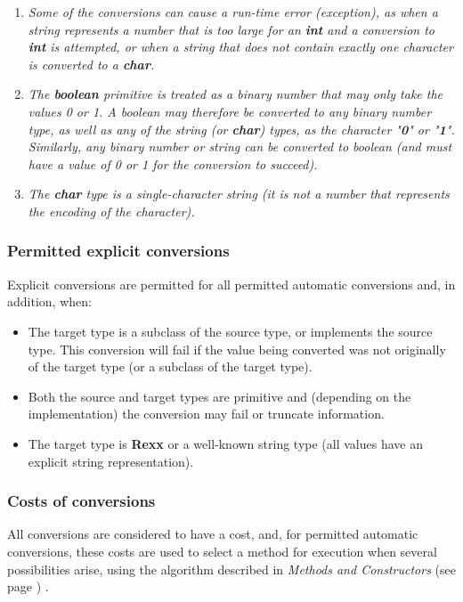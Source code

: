 \begin{enumerate}
\item \emph{Some of the conversions can cause a run-time error (exception), as
when a string represents a number that is too large for an \textbf{int}
and a conversion to \textbf{int} is attempted, or when a string that
does not contain exactly one character is converted to a
\textbf{char}.}
\item 
\emph{The \textbf{boolean} primitive is treated as a binary number that may
only take the values 0 or 1.
A boolean may therefore be converted to
any binary number type, as well as any of the string
(or \textbf{char}) types, as the character "\textbf{0}" or
"\textbf{1}".
Similarly, any binary number or string can be converted to boolean (and
must have a value of 0 or 1 for the conversion to succeed).}
\item 
\emph{The \textbf{char} type is a single-character string (it is not a
number that represents the encoding of the character).}
\end{enumerate}
\subsubsection{Permitted explicit conversions}
 
Explicit conversions are permitted for all permitted automatic
conversions and, in addition, when:
\begin{itemize}
\item 
The target type is a subclass of the source type, or implements
the source type.
This conversion will fail if the value being converted was not
originally of the target type (or a subclass of the target type).
\item 
Both the source and target types are primitive and (depending on the
implementation) the conversion may fail or truncate information.
\item 
The target type is \textbf{Rexx} or a well-known string type (all
values have an explicit string representation).
\end{itemize}
\subsubsection{Costs of conversions}\label{"id"}
 
All conversions are considered to have a cost, and, for permitted
automatic conversions, these costs are used to select a method for
execution when several possibilities arise, using the algorithm
described in  \emph{Methods and Constructors} (see page \pageref{refsmeth}) .
 
